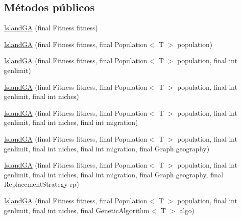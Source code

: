 \subsection*{Métodos públicos}
\begin{DoxyCompactItemize}
\item 
\hyperlink{classjenes_1_1algorithms_1_1_island_g_a_3_01_t_01extends_01_chromosome_01_4_ae36c7bc43e9b6f50a74cd3c2be85d17b}{Island\-G\-A} (final Fitness fitness)
\item 
\hyperlink{classjenes_1_1algorithms_1_1_island_g_a_3_01_t_01extends_01_chromosome_01_4_a7e50ffddeef3cd18e479696e1d7258e4}{Island\-G\-A} (final Fitness fitness, final Population$<$ T $>$ population)
\item 
\hyperlink{classjenes_1_1algorithms_1_1_island_g_a_3_01_t_01extends_01_chromosome_01_4_abaca651c904eb2d4a89380444c3dfd52}{Island\-G\-A} (final Fitness fitness, final Population$<$ T $>$ population, final int genlimit)
\item 
\hyperlink{classjenes_1_1algorithms_1_1_island_g_a_3_01_t_01extends_01_chromosome_01_4_a462cff7f1ffe7db7a13ab925a8f85c50}{Island\-G\-A} (final Fitness fitness, final Population$<$ T $>$ population, final int genlimit, final int niches)
\item 
\hyperlink{classjenes_1_1algorithms_1_1_island_g_a_3_01_t_01extends_01_chromosome_01_4_a183f962ceb12d8cd2885b0ef4a6dd988}{Island\-G\-A} (final Fitness fitness, final Population$<$ T $>$ population, final int genlimit, final int niches, final int migration)
\item 
\hyperlink{classjenes_1_1algorithms_1_1_island_g_a_3_01_t_01extends_01_chromosome_01_4_a36fa940b12f68377764049c7898fd8bd}{Island\-G\-A} (final Fitness fitness, final Population$<$ T $>$ population, final int genlimit, final int niches, final int migration, final Graph geography)
\item 
\hyperlink{classjenes_1_1algorithms_1_1_island_g_a_3_01_t_01extends_01_chromosome_01_4_a1b122013a5bad475ec45c67737029e68}{Island\-G\-A} (final Fitness fitness, final Population$<$ T $>$ population, final int genlimit, final int niches, final int migration, final Graph geography, final Replacement\-Strategy rp)
\item 
\hyperlink{classjenes_1_1algorithms_1_1_island_g_a_3_01_t_01extends_01_chromosome_01_4_a1347ad1ffe4f878c6f92d4a12484f174}{Island\-G\-A} (final Fitness fitness, final Population$<$ T $>$ population, final int genlimit, final int niches, final Genetic\-Algorithm$<$ T $>$ algo)
\item 

\end{DoxyCompactItemize}
